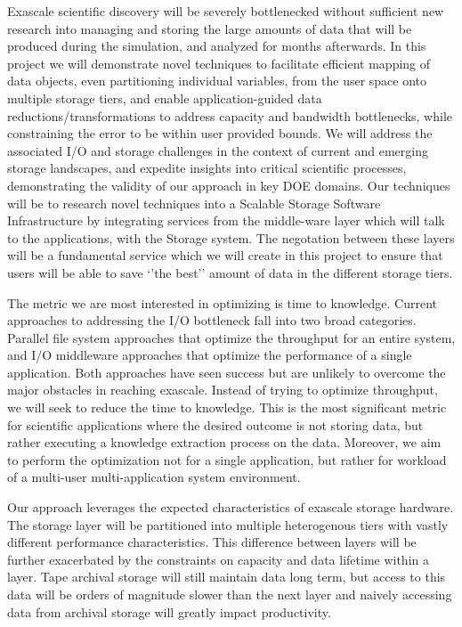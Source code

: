 Exascale scientific discovery will be severely bottlenecked without
sufficient new research into managing and storing the large amounts of data
that will be produced during the simulation, and analyzed for months
afterwards.  
%
In this project we will demonstrate novel techniques to
facilitate efficient mapping of data objects, even partitioning individual
variables, from the user space onto multiple storage tiers, and enable
application-guided data reductions/transformations to address capacity and
bandwidth bottlenecks, while constraining the error to be within user
provided bounds. 
%
We will address the associated I/O and storage challenges in the context of
current and emerging storage landscapes, and expedite insights into critical
scientific processes, demonstrating the validity of our approach in key DOE
domains.  Our techniques will be to research novel techniques into a Scalable 
Storage Software Infrastructure by integrating services from the middle-ware layer which will
talk to the applications, with the Storage system. The negotation between these layers will
be a fundamental service which we will create in this project to ensure that users will be able
to save `'the best'' amount of data in the different storage tiers.

The metric we are most interested in optimizing is time to knowledge. Current
approaches to addressing the I/O bottleneck fall into two broad
categories. Parallel file system approaches that optimize the throughput for
an entire system, and I/O middleware approaches that optimize the
performance of a single application. Both approaches have seen success but
are unlikely to overcome the major obstacles in reaching exascale. Instead
of trying to optimize throughput, we will seek to reduce the time to
knowledge. This is the most significant metric for scientific applications
where the desired outcome is not storing data, but rather executing a
knowledge extraction process on the data. Moreover, we aim to perform the
optimization not for a single application, but rather for workload of a
multi-user multi-application system environment.

Our approach leverages the expected characteristics of exascale storage
hardware. The storage layer will be partitioned into multiple heterogenous
tiers with vastly different performance characteristics. This difference
between layers will be further exacerbated by the constraints on capacity
and data lifetime within a layer. Tape archival storage will still maintain
data long term, but access to this data will be orders of magnitude slower
than the next layer and naively accessing data from archival storage will
greatly impact productivity. 

